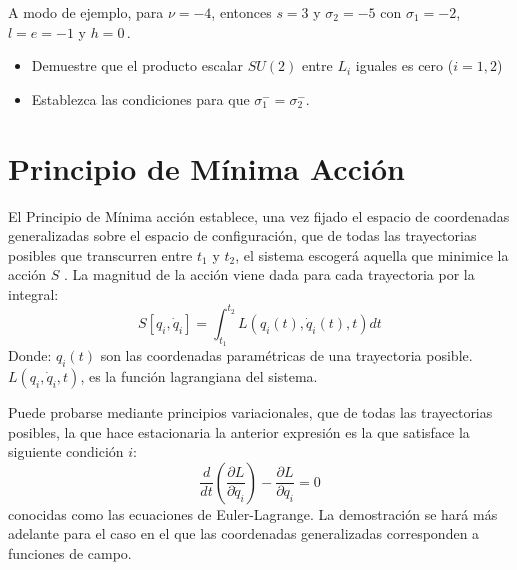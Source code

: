 \begin{frame}
A modo de ejemplo,
para $\nu=-4$, entonces $s=3$ y $\sigma_2=-5$ con $\sigma_1=-2$, $l=e=-1$ y $h=0$\,.



  \begin{itemize}
  \item Demuestre que el producto escalar $SU(2)$ entre $L_i$ iguales es cero ($i=1,2$) 
  \item   Establezca las condiciones para que $\sigma_1^-=\sigma_2^-$.
  \end{itemize}

\end{frame}



\section{Principio de Mínima Acción}
\label{sec:la}

El Principio de Mínima acción establece, una vez fijado el espacio de
coordenadas generalizadas sobre el espacio de configuración, que de
todas las trayectorias posibles que transcurren entre $t_1$ y $t_2$,
el sistema escogerá aquella que minimice la acción $S$
\cite{ActionPhysics}.  La magnitud de la acción viene dada para cada
trayectoria por la integral:
\begin{equation}
  \label{eq:la}
   S\left[q_i,\dot{q}_i\right] = \int_{t_{1}}^{t_{2}} L(q_i(t), \dot{q}_i(t),t) dt
\end{equation}
Donde:
$q_i(t)$ son las coordenadas paramétricas de una trayectoria posible.
$L(q_i,\dot{q}_i,t)$, es la función lagrangiana del sistema.


Puede probarse mediante principios variacionales, que de todas las trayectorias posibles, la que hace  estacionaria la anterior expresión es la que satisface la siguiente condición $i$:
\begin{equation}
  \label{eq:eel}
 \frac{d}{dt} \left ( \frac{\partial L}{\partial\dot{q}_i} \right ) - \frac{\partial L}{\partial q_i} = 0
\end{equation}
conocidas como las ecuaciones de Euler-Lagrange. La demostración se
hará más adelante para el caso en el que las coordenadas generalizadas
corresponden a funciones de campo. 

